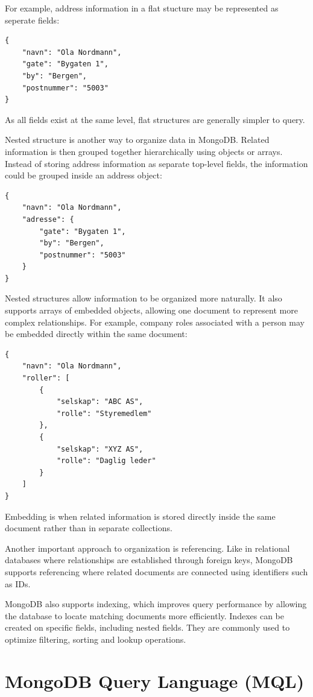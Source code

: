 For example, address information in a flat stucture may be represented as seperate fields:

\begin{verbatim}
{   
    "navn": "Ola Nordmann",
    "gate": "Bygaten 1",
    "by": "Bergen",
    "postnummer": "5003"
}
\end{verbatim}

As all fields exist at the same level, flat structures are generally simpler to query. 

Nested structure is another way to organize data in MongoDB. Related information is then grouped together hierarchically using objects or arrays. Instead of storing address information as separate top-level fields, the information could be grouped inside an address object:

\begin{verbatim}
{   
    "navn": "Ola Nordmann",
    "adresse": {
        "gate": "Bygaten 1",
        "by": "Bergen",
        "postnummer": "5003"
    }
}
\end{verbatim}

Nested structures allow information to be organized more naturally. It also supports arrays of embedded objects, allowing one document to represent more complex relationships. For example, company roles associated with a person may be embedded directly within the same document:

\begin{verbatim}
{   
    "navn": "Ola Nordmann",
    "roller": [
        {
            "selskap": "ABC AS",
            "rolle": "Styremedlem"
        },
        {
            "selskap": "XYZ AS",
            "rolle": "Daglig leder"
        }
    ]
}
\end{verbatim}

Embedding is when related information is stored directly inside the same document rather than in separate collections. 

Another important approach to organization is referencing. Like in relational databases where relationships are established through foreign keys, MongoDB supports referencing where related documents are connected using identifiers such as IDs. 

MongoDB also supports indexing, which improves query performance by allowing the database to locate matching documents more efficiently. Indexes can be created on specific fields, including nested fields. They are commonly used to optimize filtering, sorting and lookup operations. 
\section{MongoDB Query Language (MQL)}


